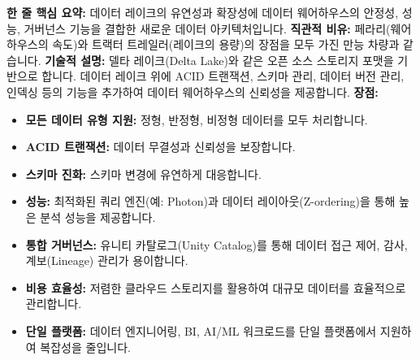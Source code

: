 \documentclass[11pt,a4paper]{article}
\theoremstyle{definition}
\begin{document}
\begin{tcolorbox}[title=\textbf{데이터 레이크하우스 (Data Lakehouse)}, colback=teal!5!white, colframe=teal!75!black, sharp corners, boxrule=0.8pt]
\textbf{한 줄 핵심 요약:} 데이터 레이크의 유연성과 확장성에 데이터 웨어하우스의 안정성, 성능, 거버넌스 기능을 결합한 새로운 데이터 아키텍처입니다.
\textbf{직관적 비유:} 페라리(웨어하우스의 속도)와 트랙터 트레일러(레이크의 용량)의 장점을 모두 가진 만능 차량과 같습니다.
\textbf{기술적 설명:} 델타 레이크(Delta Lake)와 같은 오픈 소스 스토리지 포맷을 기반으로 합니다. 데이터 레이크 위에 ACID 트랜잭션, 스키마 관리, 데이터 버전 관리, 인덱싱 등의 기능을 추가하여 데이터 웨어하우스의 신뢰성을 제공합니다.
\textbf{장점:}
\begin{itemize}
    \item \textbf{모든 데이터 유형 지원:} 정형, 반정형, 비정형 데이터를 모두 처리합니다.
    \item \textbf{ACID 트랜잭션:} 데이터 무결성과 신뢰성을 보장합니다.
    \item \textbf{스키마 진화:} 스키마 변경에 유연하게 대응합니다.
    \item \textbf{성능:} 최적화된 쿼리 엔진(예: Photon)과 데이터 레이아웃(Z-ordering)을 통해 높은 분석 성능을 제공합니다.
    \item \textbf{통합 거버넌스:} 유니티 카탈로그(Unity Catalog)를 통해 데이터 접근 제어, 감사, 계보(Lineage) 관리가 용이합니다.
    \item \textbf{비용 효율성:} 저렴한 클라우드 스토리지를 활용하여 대규모 데이터를 효율적으로 관리합니다.
    \item \textbf{단일 플랫폼:} 데이터 엔지니어링, BI, AI/ML 워크로드를 단일 플랫폼에서 지원하여 복잡성을 줄입니다.
\end{itemize}
\end{tcolorbox}
\end{document}

